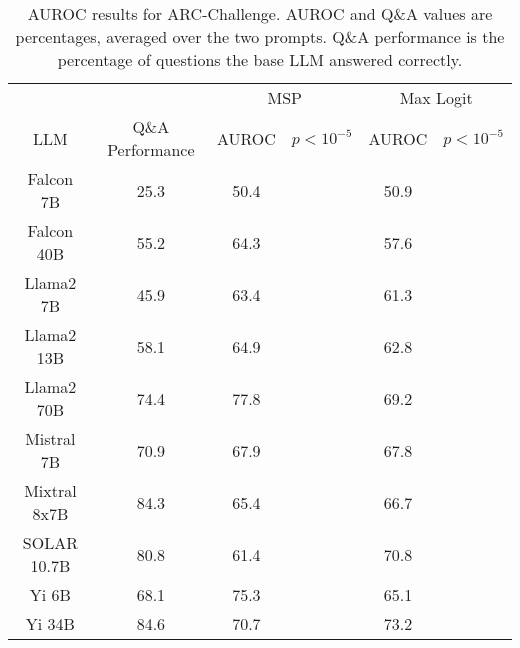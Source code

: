 \begin{table*}
\centering
\begin{tabular}{c|c|c|c|c|c}
& & \multicolumn{2}{c|}{MSP} & \multicolumn{2}{c}{Max Logit} \\ 
LLM & Q\&A Performance & AUROC & $p < 10^{-5}$ & AUROC & $p < 10^{-5}$\\ \hline
Falcon 7B & 25.3 & 50.4 &  & 50.9 & \\
Falcon 40B & 55.2 & 64.3 &  & 57.6 & \\
Llama2 7B & 45.9 & 63.4 &  & 61.3 & \\
Llama2 13B & 58.1 & 64.9 &  & 62.8 & \\
Llama2 70B & 74.4 & 77.8 &  & 69.2 & \\
Mistral 7B & 70.9 & 67.9 &  & 67.8 & \\
Mixtral 8x7B & 84.3 & 65.4 &  & 66.7 & \\
SOLAR 10.7B & 80.8 & 61.4 &  & 70.8 & \\
Yi 6B & 68.1 & 75.3 &  & 65.1 & \\
Yi 34B & 84.6 & 70.7 &  & 73.2 & \\
\hline
\end{tabular}
\caption{AUROC results for ARC-Challenge. AUROC and Q\&A values are percentages, averaged over the two prompts. Q\&A performance is the percentage of questions the base LLM answered correctly.}
\label{tab:arc_auroc}
\end{table*}
